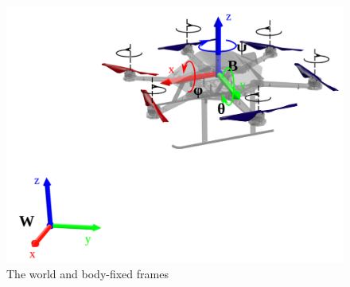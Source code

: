 \lipsum[1-10]
\begin{figure}
    \centering
    \includegraphics[width=\textwidth]{images/4464460_orig.png}
    \caption{The world and body-fixed frames}
    \label{fig:frames}
\end{figure}